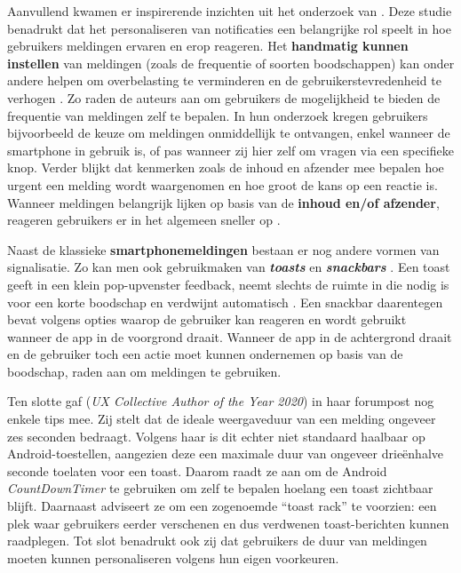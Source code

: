 Aanvullend kwamen er inspirerende inzichten uit het onderzoek van \textcite{Kim2025}. Deze studie benadrukt dat het personaliseren van notificaties een belangrijke rol speelt in hoe gebruikers meldingen ervaren en erop reageren. Het \textbf{handmatig kunnen instellen} van meldingen (zoals de frequentie of soorten boodschappen) kan onder andere helpen om overbelasting te verminderen en de gebruikerstevredenheid te verhogen \autocite{Kim2025}. Zo raden de auteurs aan om gebruikers de mogelijkheid te bieden de frequentie van meldingen zelf te bepalen. In hun onderzoek kregen gebruikers bijvoorbeeld de keuze om meldingen onmiddellijk te ontvangen, enkel wanneer de smartphone in gebruik is, of pas wanneer zij hier zelf om vragen via een specifieke knop. Verder blijkt dat kenmerken zoals de inhoud en afzender mee bepalen hoe urgent een melding wordt waargenomen en hoe groot de kans op een reactie is. Wanneer meldingen belangrijk lijken op basis van de \textbf{inhoud en/of afzender}, reageren gebruikers er in het algemeen sneller op \autocite{Kim2025}.

\vspace{1em}

Naast de klassieke \textbf{smartphonemeldingen} bestaan er nog andere vormen van signalisatie. Zo kan men ook gebruikmaken van \textit{\textbf{toasts}} en \textit{\textbf{snackbars}} \autocite{AndroidToasts2026}. Een toast geeft in een klein pop-upvenster feedback, neemt slechts de ruimte in die nodig is voor een korte boodschap en verdwijnt automatisch \autocite{AndroidToasts2026}. Een snackbar daarentegen bevat volgens \textcite{AndroidToasts2026} opties waarop de gebruiker kan reageren en wordt gebruikt wanneer de app in de voorgrond draait. Wanneer de app in de achtergrond draait en de gebruiker toch een actie moet kunnen ondernemen op basis van de boodschap, raden \textcite{AndroidToasts2026} aan om meldingen te gebruiken.

\vspace{1em}

Ten slotte gaf \textcite{ByrneHaber2019} (\textit{UX Collective Author of the Year 2020}) in haar forumpost nog enkele tips mee. Zij stelt dat de ideale weergaveduur van een melding ongeveer zes seconden bedraagt. Volgens haar is dit echter niet standaard haalbaar op Android-toestellen, aangezien deze een maximale duur van ongeveer drieënhalve seconde toelaten voor een toast. Daarom raadt ze aan om de Android \textit{CountDownTimer} te gebruiken om zelf te bepalen hoelang een toast zichtbaar blijft. Daarnaast adviseert ze om een zogenoemde ``toast rack'' te voorzien: een plek waar gebruikers eerder verschenen en dus verdwenen toast-berichten kunnen raadplegen. Tot slot benadrukt ook zij dat gebruikers de duur van meldingen moeten kunnen personaliseren volgens hun eigen voorkeuren.

